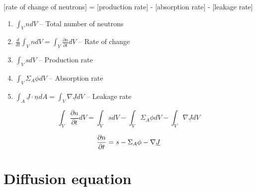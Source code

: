 \documentclass[aspectratio=1610,pdftex,dvipsnames,compress,xcolor={dvipsnames}]{beamer}
\begin{document}
\addtocounter{framenumber}{-2} 
\begin{frame}{\normalsize[rate of change of neutrons] = [production rate] - [absorption rate] - [leakage rate]}
    \begin{enumerate}[series=outerlist,topsep=0pt,itemsep=21pt,leftmargin=*,label=(\arabic*)]
        \item[]$\int_V n dV$ -- Total number of neutrons
        \item[]$\frac{d}{dt} \int_V n dV = \int_V \frac{\partial n}{\partial t} dV$ -- Rate of change
        \item[]$\int_V sdV$ -- Production rate
        \item[]$\int_V \Sigma_A \phi dV$ -- Absorption rate
        \item[]$\int_A \underline{J} \cdot \underline{n} dA = \int_V \nabla \underline{J} dV$ -- Leakage rate
    \end{enumerate}
\end{frame}


\begin{frame}[plain]{}
    \LARGE
    \begin{equation*}
        \int_V \frac{\partial{n}}{\partial{t}} dV = 
        \int_V s dV - \int_V \Sigma_A \phi dV - \int_V \nabla \underline{J} dV
    \end{equation*}
\end{frame}


\begin{frame}[plain]{}
    \begin{equation}
        \LARGE
        \frac{\partial{n}}{\partial{t}} = s - \Sigma_A \phi - \nabla \underline{J}
    \end{equation}
\end{frame}


\section{Diffusion equation}
\end{document}
